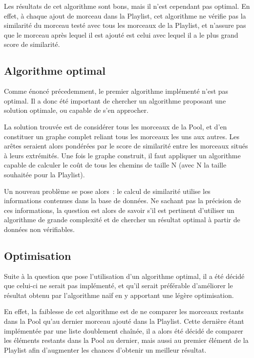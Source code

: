 Les résultats de cet algorithme sont bons, mais il n'est cependant pas optimal.
En effet, à chaque ajout de morceau dans la Playlist, cet algorithme ne vérifie
pas la similarité du morceau testé avec tous les morceaux de la Playlist, et
n'assure pas que le morceau après lequel il est ajouté est celui avec lequel
il a le plus grand score de similarité.


\subsection{Algorithme optimal}
\label{impl:selection:optimal}

Comme énoncé précedemment, le premier algorithme implémenté n'est pas optimal.
Il a donc été important de chercher un algorithme proposant une solution
optimale, ou capable de s'en approcher.\newline

La solution trouvée est de considérer tous les morceaux de la Pool, et d'en
constituer un graphe complet reliant tous les morceaux les uns aux autres. Les
arêtes seraient alors pondérées par le score de similarité entre les morceaux
situés à leurs extrémités. Une fois le graphe construit, il faut appliquer un
algorithme capable de calculer le coût de tous les chemins de taille N (avec N
la taille souhaitée pour la Playlist).\newline

Un nouveau problème se pose alors~: le calcul de similarité utilise les
informations contenues dans la base de données. Ne sachant pas la précision de
ces informations, la question est alors de savoir s'il est pertinent
d'utiliser un algorithme de grande complexité et de chercher un résultat
optimal à partir de données non vérifiables.

\subsection{Optimisation}
\label{impl:selection:optimisation}

Suite à la question que pose l'utilisation d'un algorithme optimal, il a été
décidé que celui-ci ne serait pas implémenté, et qu'il serait préférable
d'améliorer le résultat obtenu par l'algorithme naïf en y apportant une légère
optimisation.\newline

En effet, la faiblesse de cet algorithme est de ne comparer les morceaux
restants dans la Pool qu'au dernier morceau ajouté dans la Playlist. Cette
dernière étant implémentée par une liste doublement chaînée, il a alors été
décidé de comparer les éléments restants dans la Pool au dernier, mais aussi au
premier élément de la Playlist afin d'augmenter les chances d'obtenir un
meilleur résultat.


